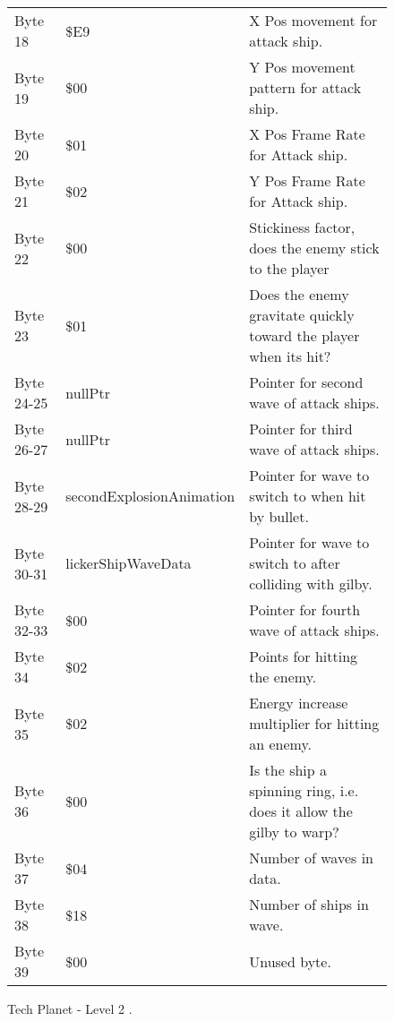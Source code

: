 \begin{figure}[H]
{\begin{adjustbox}{width=12cm}
\begin{tabular}{lll}
 Byte 18    & \$E9                      & X Pos movement for attack ship.                                     \\
 Byte 19    & \$00                      & Y Pos movement pattern for attack ship.                             \\
 Byte 20    & \$01                      & X Pos Frame Rate for Attack ship.                                   \\
 Byte 21    & \$02                      & Y Pos Frame Rate for Attack ship.                                   \\
 Byte 22    & \$00                      & Stickiness factor, does the enemy stick to the player               \\
 Byte 23    & \$01                      & Does the enemy gravitate quickly toward the player when its hit?    \\
 Byte 24-25 & nullPtr                  & Pointer for second wave of attack ships.                            \\
 Byte 26-27 & nullPtr                  & Pointer for third wave of attack ships.                             \\
 Byte 28-29 & secondExplosionAnimation & Pointer for wave to switch to when hit by bullet.                   \\
 Byte 30-31 & lickerShipWaveData       & Pointer for  wave to switch to after colliding with gilby.          \\
 Byte 32-33 & \$00                      & Pointer for fourth wave of attack ships.                            \\
 Byte 34    & \$02                      & Points for hitting the enemy.                                       \\
 Byte 35    & \$02                      & Energy increase multiplier for hitting an enemy.                    \\
 Byte 36    & \$00                      & Is the ship a spinning ring, i.e. does it allow the gilby to warp?  \\
 Byte 37    & \$04                      & Number of waves in data.                                            \\
 Byte 38    & \$18                      & Number of ships in wave.                                            \\
 Byte 39    & \$00                      & Unused byte.                                                        \\
\bottomrule
\end{tabular}

  \end{adjustbox}

  }\caption*{Tech Planet - Level 2
.}
\end{figure}

